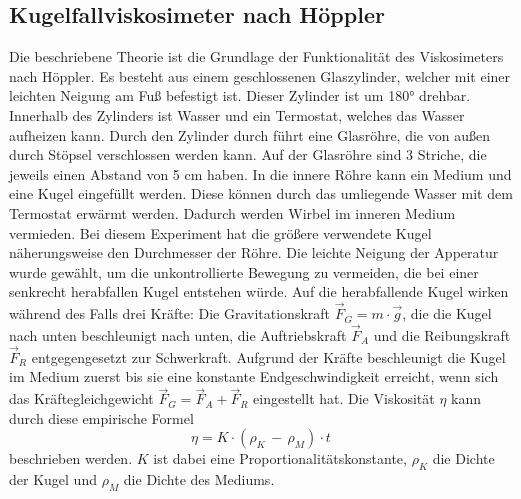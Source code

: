 \subsection{Kugelfallviskosimeter nach Höppler}
Die beschriebene Theorie ist die Grundlage der Funktionalität des Viskosimeters 
nach Höppler. Es besteht aus einem geschlossenen Glaszylinder, 
welcher mit einer leichten Neigung am Fuß befestigt
ist. Dieser Zylinder ist um 180° drehbar. 
Innerhalb des Zylinders ist Wasser und ein Termostat, welches das Wasser aufheizen 
kann.
Durch den Zylinder durch führt eine Glasröhre, die von außen durch Stöpsel 
verschlossen werden kann. Auf der Glasröhre sind 3 Striche, die jeweils 
einen Abstand von 5 \unit{\centi\meter} haben. In die innere Röhre kann
ein Medium und eine Kugel eingefüllt werden. Diese können durch das umliegende Wasser mit dem 
Termostat erwärmt werden. Dadurch werden Wirbel im inneren Medium vermieden. 
Bei diesem Experiment hat die größere verwendete Kugel näherungsweise den Durchmesser der Röhre. 
Die leichte Neigung der Apperatur wurde gewählt, um die unkontrollierte Bewegung zu vermeiden, 
die bei einer senkrecht herabfallen Kugel entstehen würde. Auf die herabfallende Kugel
wirken während des Falls drei Kräfte: Die Gravitationskraft $\vec{F}_{G} = m \cdot \vec{g}$, 
die die Kugel nach unten beschleunigt nach unten, die Auftriebskraft $\vec{F}_{A}$ und die 
Reibungskraft $\vec{F}_{R}$ entgegengesetzt zur Schwerkraft. Aufgrund der Kräfte beschleunigt
die Kugel im Medium zuerst bis sie eine konstante Endgeschwindigkeit erreicht, wenn sich das Kräftegleichgewicht 
$\vec{F}_{G} = \vec{F}_{A} + \vec{F}_{R}$ eingestellt hat.
Die Viskosität $\eta$ kann durch diese empirische Formel  
\begin{equation}
    \eta = K \cdot \left( \rho_{K}\,-\,\rho_{M} \right) \cdot t
    \label{equ:EmpirischeEtaFunktion}
\end{equation} 
beschrieben werden. $K$ ist dabei eine Proportionalitätskonstante, $\rho_{K}$ die Dichte der Kugel und $\rho_{M}$
die Dichte des Mediums.
%
%
%
